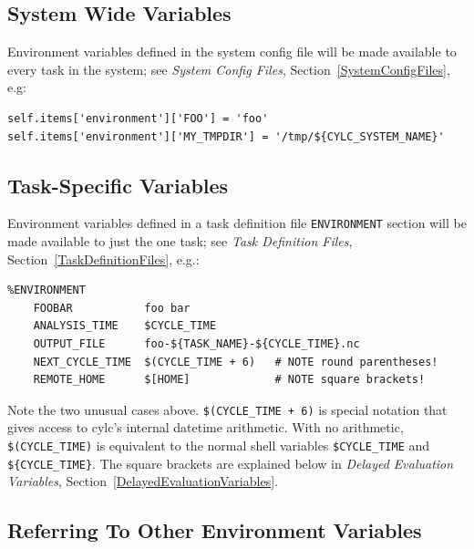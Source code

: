 \documentclass[11pt,a4paper]{article}
\begin{document}
\subsection{System Wide Variables}
\label{SystemWideVariables}

Environment variables defined in the system config file will be made
available to every task in the system; see 
{\em System Config Files}, Section~\ref{SystemConfigFiles}, e.g:

\lstset{language=Python}

\begin{lstlisting}
self.items['environment']['FOO'] = 'foo'
self.items['environment']['MY_TMPDIR'] = '/tmp/${CYLC_SYSTEM_NAME}'
\end{lstlisting}


\subsection{Task-Specific Variables}
\label{TaskSpecificVariables}

\lstset{language=cylctaskdef}

Environment variables defined in a task definition file
\lstinline=ENVIRONMENT= section will be made available
to just the one task; see {\em Task Definition Files}, 
Section~\ref{TaskDefinitionFiles}, e.g.:

\begin{lstlisting}
%ENVIRONMENT
    FOOBAR           foo bar
    ANALYSIS_TIME    $CYCLE_TIME
    OUTPUT_FILE      foo-${TASK_NAME}-${CYCLE_TIME}.nc
    NEXT_CYCLE_TIME  $(CYCLE_TIME + 6)   # NOTE round parentheses!
    REMOTE_HOME      $[HOME]             # NOTE square brackets!
\end{lstlisting}

\lstset{language=bash}

Note the two unusual cases above. \lstinline=$(CYCLE_TIME + 6)= is 
special notation that gives access to cylc's internal datetime arithmetic.
With no arithmetic, \lstinline=$(CYCLE_TIME)= is equivalent to 
the normal shell variables \lstinline=$CYCLE_TIME= and
\lstinline=${CYCLE_TIME}=. The square brackets are explained 
below in {\em Delayed Evaluation Variables},
Section~\ref{DelayedEvaluationVariables}.

\subsection{Referring To Other Environment Variables}
\label{ReferringToOtherEnvironmentVariables}
\end{document}
